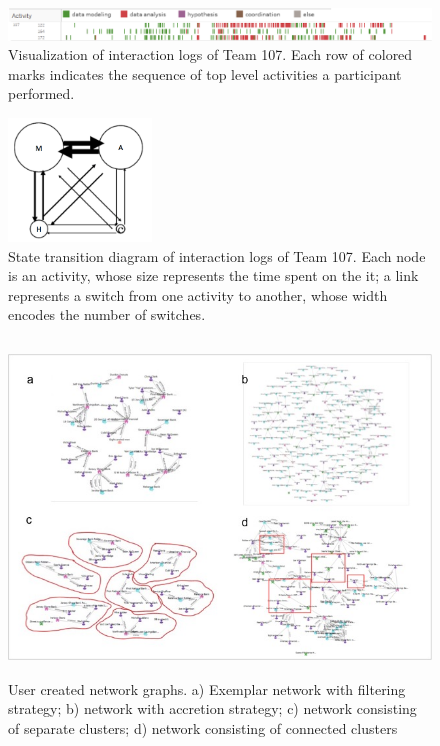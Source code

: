 \begin{figure}
\centering
\includegraphics[width=6.5in]{./img/G107-sequence.png}
\caption{Visualization of interaction logs of Team 107. Each row of
colored marks indicates the sequence of top level activities a
participant performed.}\label{fig:sequence}
\end{figure}

\begin{figure}
\centering
\includegraphics[width=1.5in]{./img/activity_transition-G107.png}
\caption{State transition diagram of interaction logs of Team 107. Each
node is an activity, whose size represents the time spent on the it; a
link represents a switch from one activity to another, whose width
encodes the number of switches.}\label{fig:transition}
\end{figure}

\begin{figure}
\centering
\includegraphics[height=3.5in]{./img/network.jpg}
\caption{User created network graphs. a) Exemplar network with filtering
strategy; b) network with accretion strategy; c) network consisting of
separate clusters; d) network consisting of connected
clusters}\label{fig:network}
\end{figure}

